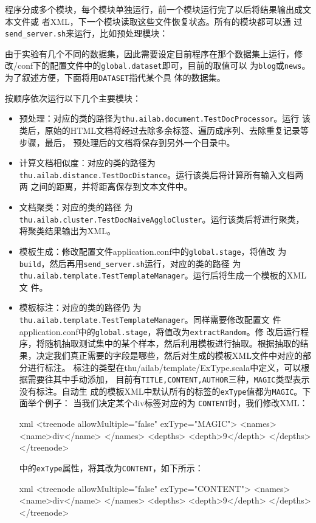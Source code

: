 \documentclass{article}
\begin{document}
程序分成多个模块，每个模块单独运行，前一个模块运行完了以后将结果输出成文本文件或
者XML，下一个模块读取这些文件恢复状态。所有的模块都可以通
过\texttt{send\_server.sh}来运行，比如预处理模块：\\

由于实验有几个不同的数据集，因此需要设定目前程序在那个数据集上运行，修
改\prj/conf下的配置文件中的\texttt{global.dataset}即可，目前的取值可以
为\texttt{blog}或\texttt{news}。为了叙述方便，下面将用\texttt{DATASET}指代某个具
体的数据集。

按顺序依次运行以下几个主要模块：
\begin{itemize}
\item 预处理：对应的类的路径为\texttt{thu.ailab.document.TestDocProcessor}。运行
  该类后，原始的HTML文档将经过去除多余标签、遍历成序列、去除重复记录等步骤，最后，
  预处理后的文档将保存到另外一个目录中。
\item 计算文档相似度：对应的类的路径为
  \texttt{thu.ailab.distance.TestDocDistance}。运行该类后将计算所有输入文档两两
  之间的距离，并将距离保存到文本文件中。
\item 文档聚类：对应的类的路径
  为\texttt{thu.ailab.cluster.TestDocNaiveAggloCluster}。运行该类后将进行聚类，
  将聚类结果输出为XML。
\item 模板生成：修改配置文件application.conf中的\texttt{global.stage}，将值改
  为\texttt{build}，然后再用\texttt{send\_server.sh}运行，对应的类的路径
  为\texttt{thu.ailab.template.TestTemplateManager}。运行后将生成一个模板的XML文
  件。
\item 模板标注：对应的类的路径仍
  为\texttt{thu.ailab.template.TestTemplateManager}。同样需要修改配置文
  件application.conf中的\texttt{global.stage}，将值改为\texttt{extractRandom}。修
  改后运行程序，将随机抽取测试集中的某个样本，然后利用模板进行抽取。根据抽取的结
  果，决定我们真正需要的字段是哪些，然后对生成的模板XML文件中对应的部分进行标注。
  标注的类型在thu/ailab/template/ExType.scala中定义，可以根据需要往其中手动添加，
  目前有\texttt{TITLE,CONTENT,AUTHOR}三种，\texttt{MAGIC}类型表示没有标注。自动生
  成的模板XML中默认所有的标签的\texttt{exType}值都为\texttt{MAGIC}。下面举个例子：
  当我们决定某个div标签对应的为
  \texttt{CONTENT}时，我们修改XML：\\
  \begin{code}{xml}
<treenode allowMultiple="false" exType="MAGIC">
      <names>
      <name>div</name>
      </names>
      <depths>
      <depth>9</depth>
      </depths>
</treenode>    
  \end{code}
  中的\texttt{exType}属性，将其改为\texttt{CONTENT}，如下所示：\\
  \begin{code}{xml}
<treenode allowMultiple="false" exType="CONTENT">
    <names>
    <name>div</name>
    </names>
    <depths>
    <depth>9</depth>
    </depths>
</treenode>
  \end{code}


\end{itemize}
\end{document}
